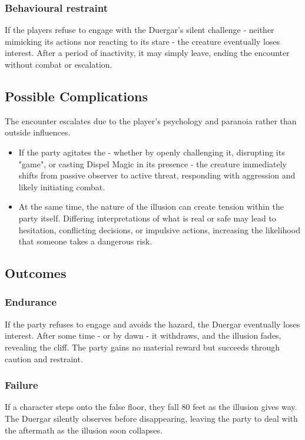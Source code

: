 \subsubsection*{Behavioural restraint}
{\entryfont If the players refuse to engage with the Duergar's silent challenge - neither mimicking its actions nor reacting to its stare - the creature eventually loses interest. After a period of inactivity, it may simply leave, ending the encounter without combat or escalation.}

\subsection*{Possible Complications}
{\entryfont The encounter escalates due to the player's psychology and paranoia rather than outside influences.
\begin{itemize}
	\item If the party agitates the \hyperref[monster:Duergar]{} - whether by openly challenging it, disrupting its "game", or casting Dispel Magic in its presence - the creature immediately shifts from passive observer to active threat, responding with aggression and likely initiating combat.
	\item At the same time, the nature of the illusion can create tension within the party itself. Differing interpretations of what is real or safe may lead to hesitation, conflicting decisions, or impulsive actions, increasing the likelihood that someone takes a dangerous risk.
\end{itemize}}

\subsection*{Outcomes}
\subsubsection*{Endurance}
{\entryfont If the party refuses to engage and avoids the hazard, the Duergar eventually loses interest. After some time - or by dawn - it withdraws, and the illusion fades, revealing the cliff. The party gains no material reward but succeeds through caution and restraint.}
\subsubsection*{Failure}
{\entryfont If a character steps onto the false floor, they fall 80 feet as the illusion gives way. The Duergar silently observes before disappearing, leaving the party to deal with the aftermath as the illusion soon collapses.}
